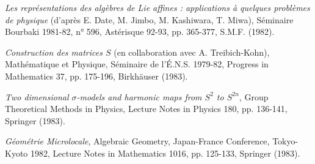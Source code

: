 \begin{description}
\item[{[33]}] \emph{Les représentations des algèbres de Lie affines :
applications à quelques problèmes de physique} (d'après E. Date, M. Jimbo,
M. Kashiwara, T. Miwa), Séminaire Bourbaki 1981-82, n° 596,
Astérisque 92-93, pp. 365-377, S.M.F. (1982).

\item[{[34]}] \emph{Construction des matrices $S$} (en collaboration avec
A. Treibich-Kohn), Mathématique et Physique, Séminaire de l'É.N.S. 1979-82,
Progress in Mathematics 37, pp. 175-196, Birkhäuser (1983).

\item[{[35]}] \emph{Two dimensional $\sigma$-models and harmonic maps from
$S^2$ to $S^{2n}$}, Group Theoretical Methods in Physics,
Lecture Notes in Physics 180, pp. 136-141, Springer (1983).

\item[{[36]}] \emph{Géométrie Microlocale}, Algebraic Geometry,
Japan-France Conference, Tokyo-Kyoto 1982, Lecture Notes in Mathematics 1016,
pp. 125-133, Springer (1983).
\end{description}

